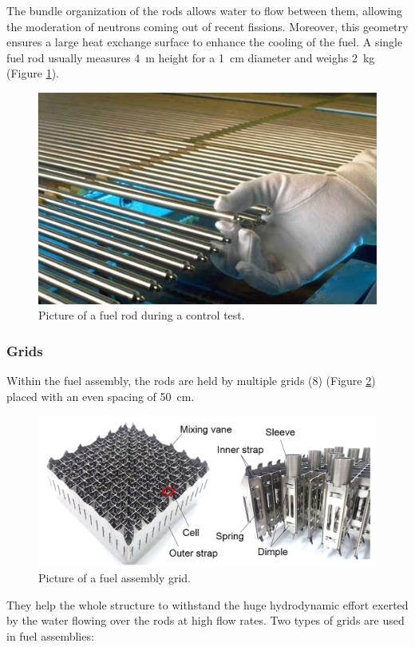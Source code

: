 \npar

The bundle organization of the rods allows water to flow between them, allowing the moderation of neutrons coming out of recent fissions. Moreover, this geometry ensures a large heat exchange surface to enhance the cooling of the fuel. A single fuel rod usually measures 4\ m height for a 1\ cm diameter and weighs 2\ kg (Figure \ref{fig:fuel_rod}).


\begin{figure}[!h]
\centering
\includegraphics[width=0.6\linewidth]{img/intro/fuel_rod.jpg}
\caption{Picture of a fuel rod during a control test. \cite{doseequivalentbanana}}
\label{fig:fuel_rod}
\end{figure}

\npar
 
\subsubsection{Grids}

Within the fuel assembly, the rods are held by multiple grids (8) (Figure \ref{fig:fuel_grid}) placed with an even spacing of 50\ cm. 

\begin{figure}[!h]
\centering
\includegraphics[width=0.8\linewidth]{img/intro/pic_grid.png}
\caption{Picture of a fuel assembly grid. \cite{yoo_NED}}
\label{fig:fuel_grid}
\end{figure}

\npar


They help the whole structure to withstand the huge hydrodynamic effort exerted by the water flowing over the rods
at high flow rates. Two types of grids are used in fuel assemblies:

